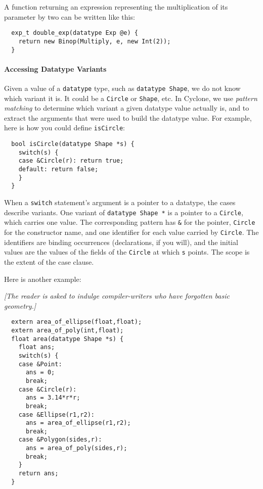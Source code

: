 A function returning an expression representing the multiplication of
its parameter by two can be written like this:
\begin{verbatim}
  exp_t double_exp(datatype Exp @e) {
    return new Binop(Multiply, e, new Int(2));
  }
\end{verbatim}

\paragraph{Accessing Datatype Variants} Given a value of a \texttt{datatype}
type, such as \texttt{datatype Shape}, we do not know which variant it is.
It could be a \texttt{Circle} or \texttt{Shape}, etc.  In Cyclone, we
use \emph{pattern matching} to determine which variant a given datatype
value actually is, and to extract the arguments that were used to
build the datatype value.  For example, here is how you could define
\texttt{isCircle}:
\begin{verbatim}
  bool isCircle(datatype Shape *s) {
    switch(s) {
    case &Circle(r): return true;
    default: return false;
    }
  }
\end{verbatim}

When a \texttt{switch} statement's argument is a pointer to a datatype,
the cases describe variants.  One variant of \texttt{datatype Shape *} is a
pointer to a \texttt{Circle}, which carries one value.  The
corresponding pattern has \texttt{\&} for the pointer, \texttt{Circle} for
the constructor name, and one identifier for each value carried by
\texttt{Circle}.  The identifiers are binding occurrences (declarations,
if you will), and the initial values are the values of the fields of
the \texttt{Circle} at which \texttt{s} points.  The scope is the extent
of the case clause.  

Here is another example:

\textit{[The reader is asked to indulge compiler-writers who have
  forgotten basic geometry.]}
\begin{verbatim}
  extern area_of_ellipse(float,float);
  extern area_of_poly(int,float);
  float area(datatype Shape *s) {
    float ans;
    switch(s) {
    case &Point:
      ans = 0;
      break;
    case &Circle(r):
      ans = 3.14*r*r;
      break;
    case &Ellipse(r1,r2):
      ans = area_of_ellipse(r1,r2);
      break;
    case &Polygon(sides,r):
      ans = area_of_poly(sides,r);
      break;
    }
    return ans;
  }
\end{verbatim}

